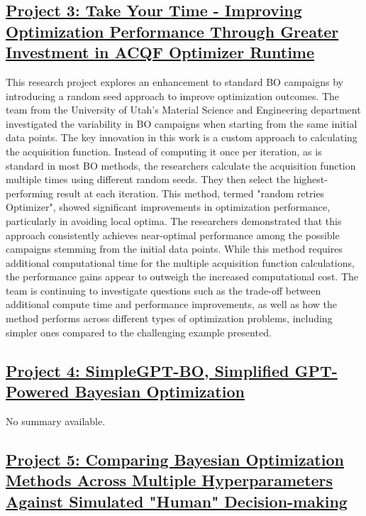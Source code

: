  \subsection*{\href{https://www.youtube.com/watch?v=WkGfShRSYW4}{Project 3: Take Your Time - Improving Optimization Performance Through Greater Investment in ACQF Optimizer Runtime}}

This research project explores an enhancement to standard BO campaigns by introducing a random seed approach to improve optimization outcomes. The team from the University of Utah's Material Science and Engineering department investigated the variability in BO campaigns when starting from the same initial data points. The key innovation in this work is a custom approach to calculating the acquisition function. Instead of computing it once per iteration, as is standard in most BO methods\cite{shahriari2015taking, snoek2012practical}, the researchers calculate the acquisition function multiple times using different random seeds. They then select the highest-performing result at each iteration. This method, termed "random retries Optimizer", showed significant improvements in optimization performance, particularly in avoiding local optima. The researchers demonstrated that this approach consistently achieves near-optimal performance among the possible campaigns stemming from the initial data points. While this method requires additional computational time for the multiple acquisition function calculations, the performance gains appear to outweigh the increased computational cost. The team is continuing to investigate questions such as the trade-off between additional compute time and performance improvements, as well as how the method performs across different types of optimization problems, including simpler ones compared to the challenging example presented.
 \subsection*{\href{https://www.youtube.com/watch?v=Qr2cz5lxM64&ab_channel=ArifinSan}{Project 4: SimpleGPT-BO, Simplified GPT-Powered Bayesian Optimization}}

No summary available.
 \subsection*{\href{https://www.youtube.com/watch?v=znXZhSqFtHg}{Project 5: Comparing Bayesian Optimization Methods Across Multiple Hyperparameters Against Simulated "Human" Decision-making}}


